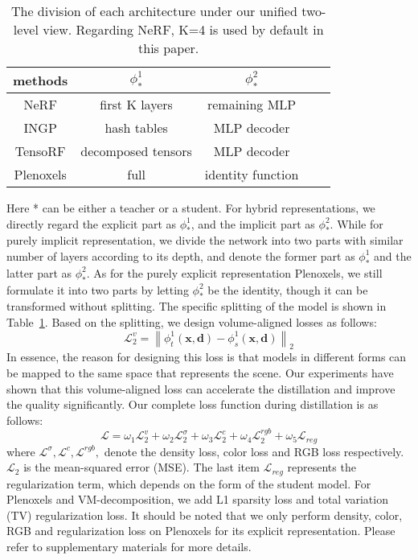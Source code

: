 \documentclass[letterpaper]{article} \usepackage{aaai23}  \usepackage{times}  \usepackage{helvet}  \usepackage{courier}  \usepackage[hyphens]{url}  \usepackage{graphicx} \urlstyle{rm} \def\UrlFont{\rm}  \usepackage{natbib}  \usepackage{caption} \frenchspacing  \setlength{\pdfpagewidth}{8.5in}  \setlength{\pdfpageheight}{11in}  \usepackage{multirow}
\begin{document}
\begin{table}[h]
\centering
\begin{tabular}{ccccc}
\hline
methods & $\phi_{*}^1$ & $\phi_{*}^2$ \\ \hline
NeRF   & first K layers & remaining MLP \\
INGP & hash tables & MLP decoder \\
TensoRF & decomposed tensors & MLP decoder \\
Plenoxels & full & identity function \\ \hline
\end{tabular}
\caption{The division of each architecture under our unified two-level view. Regarding NeRF, K=4 is used by default in this paper.}
\label{table-split}
\end{table}
Here * can be either a teacher or a student. For hybrid representations, we directly regard the explicit part as $\phi_{*}^1$, and the implicit part as $\phi_{*}^2$. While for purely implicit representation, we divide the network into two parts with similar number of layers according to its depth, and denote the former part as $\phi_{*}^1$ and the latter part as $\phi_{*}^2$. As for the purely explicit representation Plenoxels, we still formulate it into two parts by letting $\phi_{*}^2$ be the identity, though it can be transformed without splitting. The specific splitting of the model is shown in Table~\ref{table-split}. Based on the splitting, we design volume-aligned losses as follows:
 \begin{equation}
    \mathcal{L}_{2}^{v} = \left \| \phi_{t}^1(\mathbf{x}, \mathbf{d}) -\phi_{s}^1(\mathbf{x}, \mathbf{d}) \right \| _{2}
\end{equation}
In essence, the reason for designing this loss is that models in different forms can be mapped to the same space that represents the scene. Our experiments have shown that this volume-aligned loss can accelerate the distillation and improve the quality significantly. Our complete loss function during distillation is as follows:
\begin{equation}
\mathcal{L}= \omega_{1}\mathcal{L}_{2}^{v} + \omega_{2}\mathcal{L}_{2}^{\sigma}  + \omega_{3}\mathcal{L}_{2}^{c} + \omega_{4}\mathcal{L}_{2}^{rgb} + \omega_{5}\mathcal{L}_{reg}
\end{equation}
where $\mathcal{L}^\sigma,\mathcal{L}^c,\mathcal{L}^{rgb},$ denote the density loss, color loss and RGB loss respectively. $\mathcal{L}_{2}$ is the mean-squared error (MSE). The last item $\mathcal{L}_{r e g}$ represents the regularization term, which depends on the form of the student model. For Plenoxels and VM-decomposition, we add L1 sparsity loss and total variation (TV) regularization loss.
It should be noted that we only perform density, color, RGB and regularization loss on Plenoxels for its explicit representation. Please refer to supplementary materials for more details.
\end{document}
